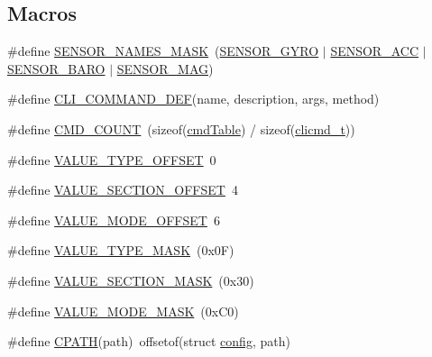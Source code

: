 \subsection*{Macros}
\begin{DoxyCompactItemize}
\item 
\#define \hyperlink{group__cli_ga29ae8f9eec42c58b3465fa739a43f051}{S\+E\+N\+S\+O\+R\+\_\+\+N\+A\+M\+E\+S\+\_\+\+M\+A\+S\+K}~(\hyperlink{sensors_8h_a4fb7fae8086f82949c1bee54d206f24ea84b967fe10b7c1cfe2f779d99407703a}{S\+E\+N\+S\+O\+R\+\_\+\+G\+Y\+R\+O} $\vert$ \hyperlink{sensors_8h_a4fb7fae8086f82949c1bee54d206f24ea1b0941255a2719bc1474e805f851f613}{S\+E\+N\+S\+O\+R\+\_\+\+A\+C\+C} $\vert$ \hyperlink{sensors_8h_a4fb7fae8086f82949c1bee54d206f24ead6e973b156c9713198fd43f7eae95f56}{S\+E\+N\+S\+O\+R\+\_\+\+B\+A\+R\+O} $\vert$ \hyperlink{sensors_8h_a4fb7fae8086f82949c1bee54d206f24ea71629ca37f0c01db723a2047f660516e}{S\+E\+N\+S\+O\+R\+\_\+\+M\+A\+G})
\item 
\#define \hyperlink{group__cli_ga952e65609714fefa61c61561d2d089a9}{C\+L\+I\+\_\+\+C\+O\+M\+M\+A\+N\+D\+\_\+\+D\+E\+F}(name, description, args, method)
\item 
\#define \hyperlink{group__cli_ga29ebdd0ea51f66291f8602228c655d17}{C\+M\+D\+\_\+\+C\+O\+U\+N\+T}~(sizeof(\hyperlink{group__cli_ga1c33d301f2139455db286a7ab2a71294}{cmd\+Table}) / sizeof(\hyperlink{structclicmd__t}{clicmd\+\_\+t}))
\item 
\#define \hyperlink{group__cli_gaeb0a3e46a1dbcaf60a5f4b4d0e64facc}{V\+A\+L\+U\+E\+\_\+\+T\+Y\+P\+E\+\_\+\+O\+F\+F\+S\+E\+T}~0
\item 
\#define \hyperlink{group__cli_ga07e11569f7783facc074d0b6b751812b}{V\+A\+L\+U\+E\+\_\+\+S\+E\+C\+T\+I\+O\+N\+\_\+\+O\+F\+F\+S\+E\+T}~4
\item 
\#define \hyperlink{group__cli_gad63f54aad5a81eef46bcacc6c6eb1d75}{V\+A\+L\+U\+E\+\_\+\+M\+O\+D\+E\+\_\+\+O\+F\+F\+S\+E\+T}~6
\item 
\#define \hyperlink{group__cli_gaa59e0e501992a5f1e770023bb4d4e413}{V\+A\+L\+U\+E\+\_\+\+T\+Y\+P\+E\+\_\+\+M\+A\+S\+K}~(0x0\+F)
\item 
\#define \hyperlink{group__cli_ga0f37d8d63575d51041fac0988c5d4119}{V\+A\+L\+U\+E\+\_\+\+S\+E\+C\+T\+I\+O\+N\+\_\+\+M\+A\+S\+K}~(0x30)
\item 
\#define \hyperlink{group__cli_gac23f63a7cce70c8142efa920e07f57b3}{V\+A\+L\+U\+E\+\_\+\+M\+O\+D\+E\+\_\+\+M\+A\+S\+K}~(0x\+C0)
\item 
\#define \hyperlink{group__cli_gac1b51cb038b2b86710dff07620ec6371}{C\+P\+A\+T\+H}(path)~offsetof(struct \hyperlink{structconfig}{config}, path)

\end{DoxyCompactItemize}
